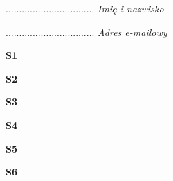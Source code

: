 .................................
\textit{Imię i nazwisko}

.................................
\textit{Adres e-mailowy}

\Large \textbf{S1} %

\Large \textbf{S2} %

\Large \textbf{S3}

\Large \textbf{S4}

\Large \textbf{S5}

\Large \textbf{S6}

